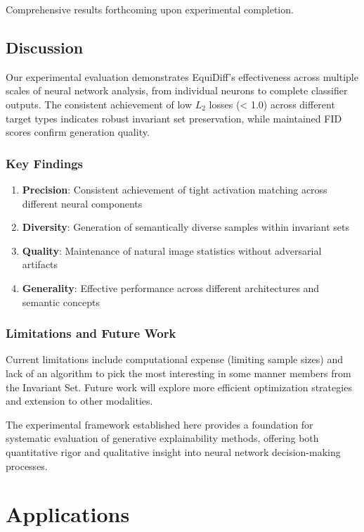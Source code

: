 \documentclass[licencjacka,en]{pracamgr}
\newcommand{\method}[1]{EquiDiff}  %
\begin{document}
Comprehensive results forthcoming upon experimental completion.

\section{Discussion}

Our experimental evaluation demonstrates \method{}'s effectiveness across multiple scales of neural network analysis, from individual neurons to complete classifier outputs. The consistent achievement of low $L_2$ losses (< 1.0) across different target types indicates robust invariant set preservation, while maintained FID scores confirm generation quality.

\subsection{Key Findings}

\begin{enumerate}
\item \textbf{Precision}: Consistent achievement of tight activation matching across different neural components
\item \textbf{Diversity}: Generation of semantically diverse samples within invariant sets
\item \textbf{Quality}: Maintenance of natural image statistics without adversarial artifacts
\item \textbf{Generality}: Effective performance across different architectures and semantic concepts
\end{enumerate}

\subsection{Limitations and Future Work}

Current limitations include computational expense (limiting sample sizes) and lack of an algorithm to pick the most interesting in some manner members from the Invariant Set. Future work will explore more efficient optimization strategies and extension to other modalities.

The experimental framework established here provides a foundation for systematic evaluation of generative explainability methods, offering both quantitative rigor and qualitative insight into neural network decision-making processes.


\chapter{Applications}\label{r:applications}
\end{document}
